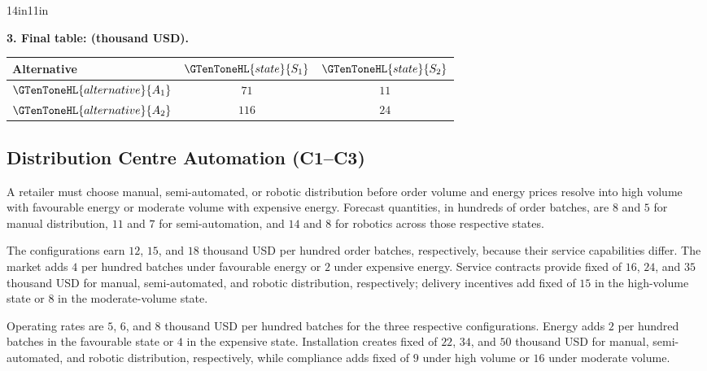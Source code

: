 \begin{CalculationLandscape}{14in}{11in}
\noindent\begin{minipage}{\linewidth}
\textbf{3. Final  table:  (thousand USD).}
\begin{center}
\begin{tabular}{@{}lcc@{}}
\toprule
Alternative & \(\GTenToneHL{state}{S_1}\) & \(\GTenToneHL{state}{S_2}\) \\
\midrule
\(\GTenToneHL{alternative}{A_1}\) & \(71\) & \(11\) \\
\(\GTenToneHL{alternative}{A_2}\) & \(116\) & \(24\) \\
\bottomrule
\end{tabular}
\end{center}
\end{minipage}



\end{CalculationLandscape}


	\subsection{Distribution Centre Automation (C1--C3)}
	\label{sec:problem20-distribution-centre-automation-c1-c3}

	A retailer must choose manual, semi-automated, or robotic distribution before order volume and energy prices resolve into high volume with favourable energy or moderate volume with expensive energy. Forecast quantities, in hundreds of order batches, are \(8\) and \(5\) for manual distribution, \(11\) and \(7\) for semi-automation, and \(14\) and \(8\) for robotics across those respective states.

	The configurations earn \(12\), \(15\), and \(18\) thousand USD per hundred order batches, respectively, because their service capabilities differ. The market adds \(4\) per hundred batches under favourable energy or \(2\) under expensive energy. Service contracts provide fixed  of \(16\), \(24\), and \(35\) thousand USD for manual, semi-automated, and robotic distribution, respectively; delivery incentives add fixed  of \(15\) in the high-volume state or \(8\) in the moderate-volume state.

	Operating rates are \(5\), \(6\), and \(8\) thousand USD per hundred batches for the three respective configurations. Energy adds \(2\) per hundred batches in the favourable state or \(4\) in the expensive state. Installation creates fixed  of \(22\), \(34\), and \(50\) thousand USD for manual, semi-automated, and robotic distribution, respectively, while compliance adds fixed  of \(9\) under high volume or \(16\) under moderate volume.

